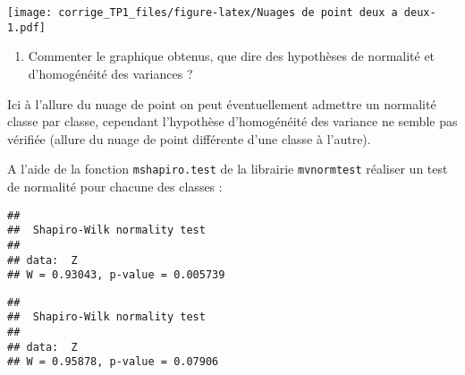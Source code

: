 \documentclass[
]{article}
\newenvironment{Shaded}{\begin{snugshade}}{\end{snugshade}}
\newcommand{\CommentTok}[1]{\textcolor[rgb]{0.56,0.35,0.01}{\textit{#1}}}
\newcommand{\DecValTok}[1]{\textcolor[rgb]{0.00,0.00,0.81}{#1}}
\newcommand{\KeywordTok}[1]{\textcolor[rgb]{0.13,0.29,0.53}{\textbf{#1}}}
\newcommand{\NormalTok}[1]{#1}
\newcommand{\OperatorTok}[1]{\textcolor[rgb]{0.81,0.36,0.00}{\textbf{#1}}}
\newcommand{\StringTok}[1]{\textcolor[rgb]{0.31,0.60,0.02}{#1}}
\providecommand{\tightlist}{%
  \setlength{\itemsep}{0pt}\setlength{\parskip}{0pt}}
\begin{document}
\texttt{[image: corrige\_TP1\_files/figure-latex/Nuages de point deux a deux-1.pdf]}

\begin{enumerate}
\def\labelenumi{\arabic{enumi}.}
\setcounter{enumi}{8}
\tightlist
\item
  Commenter le graphique obtenus, que dire des hypothèses de normalité
  et d'homogénéité des variances ?
\end{enumerate}

Ici à l'allure du nuage de point on peut éventuellement admettre un
normalité classe par classe, cependant l'hypothèse d'homogénéité des
variance ne semble pas vérifiée (allure du nuage de point différente
d'une classe à l'autre).

A l'aide de la fonction \texttt{mshapiro.test} de la librairie
\texttt{mvnormtest} réaliser un test de normalité pour chacune des
classes :

\begin{Shaded}
\end{Shaded}

\begin{verbatim}
## 
##  Shapiro-Wilk normality test
## 
## data:  Z
## W = 0.93043, p-value = 0.005739
\end{verbatim}

\begin{Shaded}
\end{Shaded}

\begin{verbatim}
## 
##  Shapiro-Wilk normality test
## 
## data:  Z
## W = 0.95878, p-value = 0.07906
\end{verbatim}

\begin{Shaded}
\end{Shaded}
\end{document}
